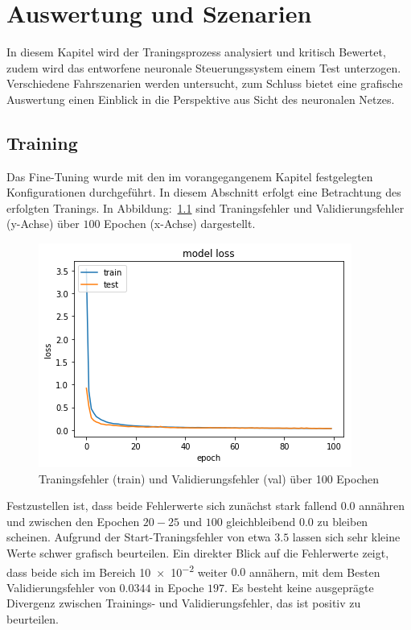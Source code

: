 %
\chapter{Auswertung und Szenarien}
In diesem Kapitel wird der Traningsprozess analysiert und kritisch Bewertet, zudem wird das entworfene neuronale Steuerungssystem einem Test unterzogen. Verschiedene Fahrszenarien werden untersucht, zum Schluss bietet eine grafische Auswertung einen Einblick in die Perspektive aus Sicht des neuronalen Netzes.

\section{Training}
Das Fine-Tuning wurde mit den im vorangegangenem Kapitel festgelegten Konfigurationen durchgeführt. In diesem Abschnitt erfolgt eine Betrachtung des erfolgten Tranings. In Abbildung:~\ref{img:loss} sind Traningsfehler und Validierungsfehler (y-Achse) über $100$ Epochen (x-Achse) dargestellt. 

\begin{figure}[h]
	\centering
	\includegraphics[scale=0.7]{figures/loss.png}
	\caption{Traningsfehler (train) und Validierungsfehler (val) über 100 Epochen}
	\label{img:loss}
\end{figure}

Festzustellen ist, dass beide Fehlerwerte sich zunächst stark fallend $0.0$ annähren und zwischen den Epochen $20-25$ und $100$ gleichbleibend $0.0$ zu bleiben scheinen. Aufgrund der Start-Traningsfehler von etwa $3.5$ lassen sich sehr kleine Werte schwer grafisch beurteilen. Ein direkter Blick auf die Fehlerwerte zeigt, dass beide sich im Bereich \num{10e-2} weiter $0.0$ annähern, mit dem Besten Validierungsfehler von $0.0344$ in Epoche $197$. Es besteht keine ausgeprägte Divergenz zwischen Trainings- und Validierungsfehler, das ist positiv zu beurteilen.


